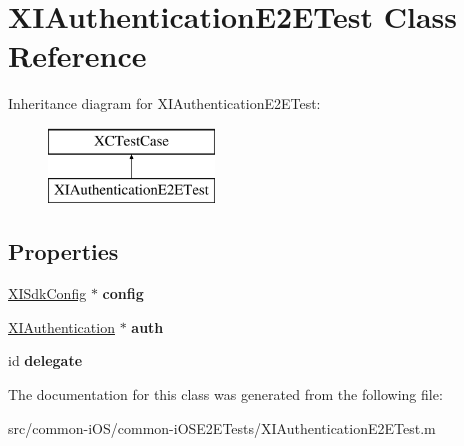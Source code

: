 \hypertarget{interface_x_i_authentication_e2_e_test}{}\section{X\+I\+Authentication\+E2\+E\+Test Class Reference}
\label{interface_x_i_authentication_e2_e_test}
Inheritance diagram for X\+I\+Authentication\+E2\+E\+Test\+:\begin{figure}[H]
\begin{center}
\leavevmode
\includegraphics[height=2.000000cm]{interface_x_i_authentication_e2_e_test}
\end{center}
\end{figure}
\subsection*{Properties}
\begin{DoxyCompactItemize}
\item 
\hypertarget{interface_x_i_authentication_e2_e_test_a0b577a16a693fd8b98f1398fcc5faaaf}{}\label{interface_x_i_authentication_e2_e_test_a0b577a16a693fd8b98f1398fcc5faaaf} 
\hyperlink{class_x_i_sdk_config}{X\+I\+Sdk\+Config} $\ast$ {\bfseries config}
\item 
\hypertarget{interface_x_i_authentication_e2_e_test_ad5074b31baba456eaf6d7fc59c4963b5}{}\label{interface_x_i_authentication_e2_e_test_ad5074b31baba456eaf6d7fc59c4963b5} 
\hyperlink{class_x_i_authentication}{X\+I\+Authentication} $\ast$ {\bfseries auth}
\item 
\hypertarget{interface_x_i_authentication_e2_e_test_a9c0d7108442c1b8dedb6464217fe5f97}{}\label{interface_x_i_authentication_e2_e_test_a9c0d7108442c1b8dedb6464217fe5f97} 
id {\bfseries delegate}
\end{DoxyCompactItemize}


The documentation for this class was generated from the following file\+:\begin{DoxyCompactItemize}
\item 
src/common-\/i\+O\+S/common-\/i\+O\+S\+E2\+E\+Tests/X\+I\+Authentication\+E2\+E\+Test.\+m\end{DoxyCompactItemize}
